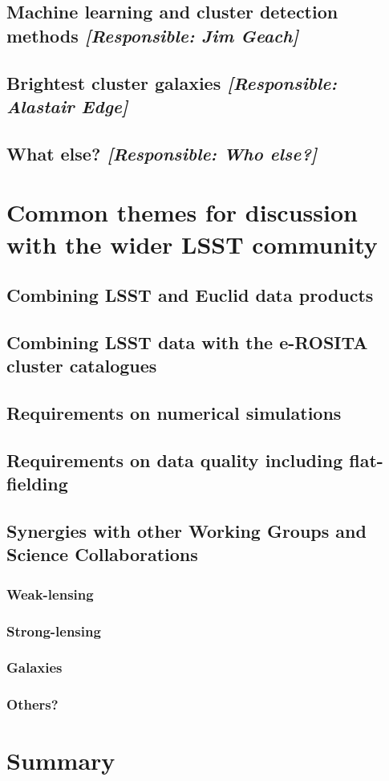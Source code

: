 \documentclass[a4paper,11pt]{article}
\begin{document}
\subsection{Machine learning and cluster detection methods {\it [Responsible: Jim Geach]}}

\subsection{Brightest cluster galaxies {\it [Responsible: Alastair Edge]}}


\subsection{What else? {\it [Responsible: Who else?]}}

\section{Common themes for discussion with the wider LSST community}

\subsection{Combining LSST and Euclid data products}

\subsection{Combining LSST data with the e-ROSITA cluster catalogues}

\subsection{Requirements on numerical simulations}

\subsection{Requirements on data quality including flat-fielding}

\subsection{Synergies with other Working Groups and Science Collaborations}

\subsubsection{Weak-lensing}

\subsubsection{Strong-lensing}

\subsubsection{Galaxies}

\subsubsection{Others?}

\section{Summary}
\end{document}
